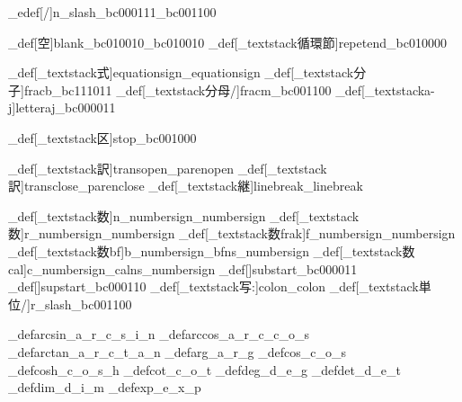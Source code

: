 \brl@char_edef[/]{n_slash}{\brl@char_bc000111\brl@char_bc001100}





\brl@char_def[空]{blank}{\brl@char_bc010010\brl@char_bc010010}
\brl@char_def[\brl@char_textstack{循環節}{}]{repetend}{\brl@char_bc010000}

\brl@char_def[\brl@char_textstack{式}{}]{equationsign}{\brl@char@alias_equationsign}
\brl@char_def[\brl@char_textstack{分子}{}]{fracb}{\brl@char_bc111011}
\brl@char_def[\brl@char_textstack{分母}{/}]{fracm}{\brl@char_bc001100}
\brl@char_def[\brl@char_textstack{a-j}{}]{letteraj}{\brl@char_bc000011}

\brl@char_def[\brl@char_textstack{区}{}]{stop}{\brl@char_bc001000}

\brl@char_def[\brl@char_textstack{訳}{}]{transopen}{\brl@char@alias_parenopen}
\brl@char_def[\brl@char_textstack{訳}{}]{transclose}{\brl@char@alias_parenclose}
\brl@char_def[\brl@char_textstack{継}{}]{linebreak}{\brl@char@alias_linebreak}

\brl@char_def[\brl@char_textstack{数}{}]{n_numbersign}{\brl@char@alias_numbersign}
\brl@char_def[\brl@char_textstack{数}{}]{r_numbersign}{\brl@char@alias_numbersign}
\brl@char_def[\brl@char_textstack{数}{frak}]{f_numbersign}{\brl@char@alias_numbersign}
\brl@char_def[\brl@char_textstack{数}{bf}]{b_numbersign}{\brl@char@alias_bfns\brl@char@alias_numbersign}
\brl@char_def[\brl@char_textstack{数}{cal}]{c_numbersign}{\brl@char@alias_calns\brl@char@alias_numbersign}
\brl@char_def[\brl@char@textunderscore]{substart}{\brl@char_bc000011}
\brl@char_def[]{supstart}{\brl@char_bc000110}
\brl@char_def[\brl@char_textstack{写}{:}]{colon}{\brl@char@alias_colon}
\brl@char_def[\brl@char_textstack{単位}{/}]{r_slash}{\brl@char_bc001100}%




\brl@char_def{arcsin}{\brl@char@alias_a\brl@char@alias_r\brl@char@alias_c\brl@char@alias_s\brl@char@alias_i\brl@char@alias_n}
\brl@char_def{arccos}{\brl@char@alias_a\brl@char@alias_r\brl@char@alias_c\brl@char@alias_c\brl@char@alias_o\brl@char@alias_s}
\brl@char_def{arctan}{\brl@char@alias_a\brl@char@alias_r\brl@char@alias_c\brl@char@alias_t\brl@char@alias_a\brl@char@alias_n}
\brl@char_def{arg}{\brl@char@alias_a\brl@char@alias_r\brl@char@alias_g}
\brl@char_def{cos}{\brl@char@alias_c\brl@char@alias_o\brl@char@alias_s}
\brl@char_def{cosh}{\brl@char@alias_c\brl@char@alias_o\brl@char@alias_s\brl@char@alias_h}
\brl@char_def{cot}{\brl@char@alias_c\brl@char@alias_o\brl@char@alias_t}
\brl@char_def{deg}{\brl@char@alias_d\brl@char@alias_e\brl@char@alias_g}
\brl@char_def{det}{\brl@char@alias_d\brl@char@alias_e\brl@char@alias_t}
\brl@char_def{dim}{\brl@char@alias_d\brl@char@alias_i\brl@char@alias_m}
\brl@char_def{exp}{\brl@char@alias_e\brl@char@alias_x\brl@char@alias_p}

